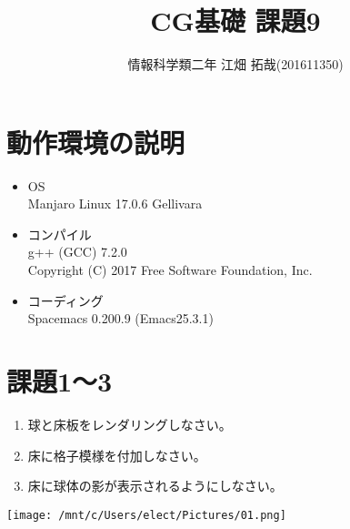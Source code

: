 \documentclass{scrartcl}
\author{情報科学類二年 江畑 拓哉(201611350)}
\date{}
\title{CG基礎 課題9}
\begin{document}
\maketitle

\section{動作環境の説明}
\label{sec:org4c8a8d4}
\begin{itemize}
\item OS\\
Manjaro Linux 17.0.6 Gellivara\\
\item コンパイル\\
g++ (GCC) 7.2.0\\
Copyright (C) 2017 Free Software Foundation, Inc.\\
\item コーディング\\
Spacemacs 0.200.9 (Emacs25.3.1)\\
\end{itemize}


\section{課題1〜3}
\label{sec:org6f7a2f2}
\begin{enumerate}
\item 球と床板をレンダリングしなさい。\\
\item 床に格子模様を付加しなさい。\\
\item 床に球体の影が表示されるようにしなさい。\\
\end{enumerate}

\begin{center}
\texttt{[image: /mnt/c/Users/elect/Pictures/01.png]}
\end{center}
\end{document}
